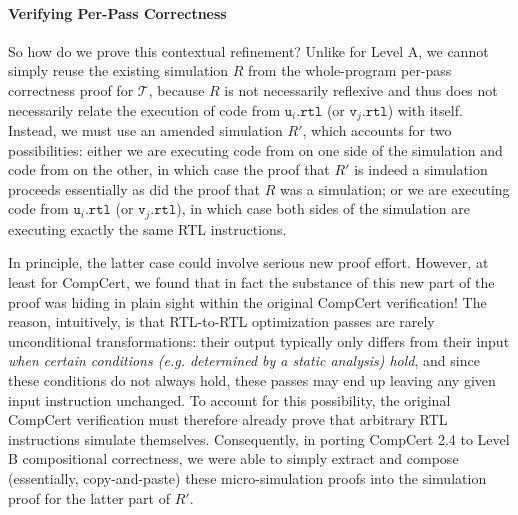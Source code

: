 \paragraph{Verifying Per-Pass Correctness}

So how do we prove this contextual refinement?  Unlike for Level A, we
cannot simply reuse the existing simulation $R$ from the whole-program
per-pass correctness proof for $\mathcal{T}$, because $R$ is not
necessarily reflexive and thus does not necessarily relate the
execution of code from $\mathtt{u}_i\mathtt{.rtl}$ (or
$\mathtt{v}_j\mathtt{.rtl}$) with itself.  Instead, we must use an
amended simulation $R'$, which accounts for two possibilities: either
we are executing code from  on one side of the simulation and
code from  on the other, in which case the proof that $R'$ is
indeed a simulation proceeds essentially as did the proof that $R$
was a simulation; or we are executing code from
$\mathtt{u}_i\mathtt{.rtl}$ (or $\mathtt{v}_j\mathtt{.rtl}$), in which
case both sides of the simulation are executing exactly the same
RTL instructions.

In principle, the latter case could involve serious new proof effort.
However, at least for CompCert, we found that in fact the substance of
this new part of the proof was hiding in plain sight within the
original CompCert verification!  The reason, intuitively, is that
RTL-to-RTL optimization passes are rarely unconditional
transformations: their output typically only differs from their input
\emph{when certain conditions (e.g. determined by a static analysis)
  hold}, and since these conditions do not always hold, these passes
may end up leaving any given input instruction unchanged.  To account
for this possibility, the original CompCert verification must
therefore already prove that arbitrary RTL instructions simulate
themselves.  Consequently, in porting CompCert 2.4 to Level B
compositional correctness, we were able to simply extract and compose
(essentially, copy-and-paste) these micro-simulation proofs into the
simulation proof for the latter part of $R'$.









